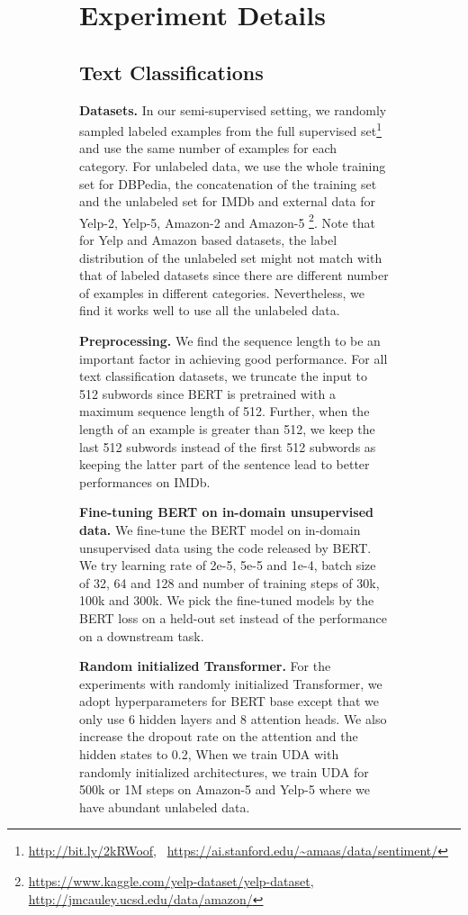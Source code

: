 \documentclass{article}
\begin{document}
\begin{figure}[ht]
\begin{subfigure}{.19\textwidth}
{\section{Experiment Details}
\label{sec:exp_details}
\subsection{Text Classifications}
\textbf{Datasets.} In our semi-supervised setting, we randomly sampled labeled examples from the full supervised set\footnote{\url{http://bit.ly/2kRWoof}, \  \url{https://ai.stanford.edu/~amaas/data/sentiment/}} and use the same number of examples for each category. For unlabeled data, we use the whole training set for DBPedia, the concatenation of the training set and the unlabeled set for IMDb and  external data for Yelp-2, Yelp-5, Amazon-2 and Amazon-5 \cite{mcauley2015image}\footnote{\url{https://www.kaggle.com/yelp-dataset/yelp-dataset}, \url{http://jmcauley.ucsd.edu/data/amazon/}}. Note that for Yelp and Amazon based datasets, the label distribution of the unlabeled set might not match with that of labeled datasets since there are different number of examples in different categories. Nevertheless, we find it works well to use all the unlabeled data.


 
\textbf{Preprocessing.} 
We find the sequence length to be an important factor in achieving good performance. For all text classification datasets, we truncate the input to 512 subwords since BERT is pretrained with a maximum sequence length of 512.  Further, when the length of an example is greater than 512, we keep the last 512 subwords instead of the first 512 subwords as keeping the latter part of the sentence lead to better performances on IMDb. 


\textbf{Fine-tuning BERT on in-domain unsupervised data.} We fine-tune the BERT model on in-domain unsupervised data using the code released by BERT. We try learning rate of 2e-5, 5e-5 and 1e-4, batch size of 32, 64 and 128 and number of training steps of 30k, 100k and 300k. We pick the fine-tuned models by the BERT loss on a held-out set instead of the performance on a downstream task. 

\textbf{Random initialized Transformer.} For the experiments with randomly initialized Transformer, we adopt hyperparameters for BERT base except that we only use 6 hidden layers and 8 attention heads. We also increase the dropout rate on the attention and the hidden states to 0.2, When we train UDA with randomly initialized architectures, we train UDA for 500k or 1M steps on Amazon-5 and Yelp-5 where we have abundant unlabeled data.

}
\end{subfigure}
\end{figure}
\end{document}
